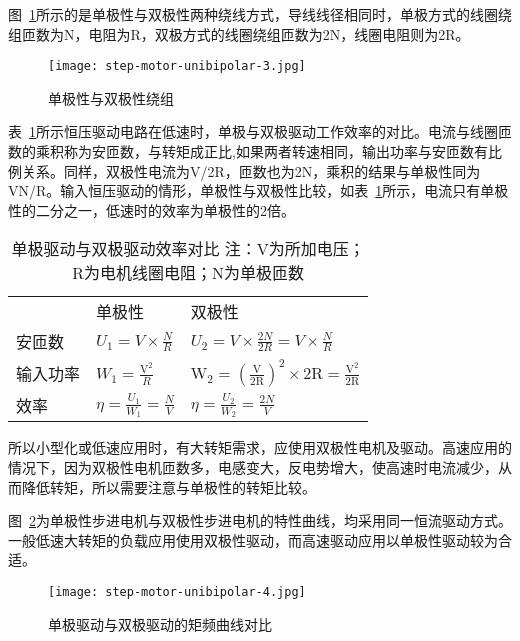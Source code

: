 图~\ref{fig:step-motor-unibipolar-3}所示的是单极性与双极性两种绕线方式，导线线径相同时，单极方式的线圈绕组匝数为N，电阻为R，双极方式的线圈绕组匝数为2N，线圈电阻则为2R。

\begin{figure}[htbp]
    \centering
    \texttt{[image: step-motor-unibipolar-3.jpg]}
    \caption{单极性与双极性绕组}
    \label{fig:step-motor-unibipolar-3}
\end{figure}

表~\ref{tab:step-motor-unibipolar}所示恒压驱动电路在低速时，单极与双极驱动工作效率的对比。电流与线圈匝数的乘积称为安匝数，与转矩成正比,如果两者转速相同，输出功率与安匝数有比例关系。同样，双极性电流为V/2R，匝数也为2N，乘积的结果与单极性同为VN/R。输入恒压驱动的情形，单极性与双极性比较，如表~\ref{tab:step-motor-unibipolar}所示，电流只有单极性的二分之一，低速时的效率为单极性的2倍。

\begin{table}[htbp]
    \centering
    \begin{tabular}{lll}
     & 单极性 & 双极性 \\
    安匝数 & $U_{1}=V \times \frac{N}{R}$ & $U_{2}=V \times \frac{2N}{2R}=V \times \frac{N}{R}$\\
    输入功率 & $W_{1}=\frac{\mathrm{V}^{2}}{R}$ & $\mathrm{W}_{2}=(\frac{\mathrm{V}}{2 \mathrm{R}} )^{2} \times  2 \mathrm{R}=\frac{\mathrm{V}^{2}}{2 \mathrm{R}} $ \\
    效率 & $\eta = \frac{U_{1}}{W_{1}} = \frac{N}{V}$ & $\eta = \frac{U_{2}}{W_{2}} = \frac{2N}{V}$
    \end{tabular}
    \caption{单极驱动与双极驱动效率对比 注：V为所加电压；R为电机线圈电阻；N为单极匝数}
    \label{tab:step-motor-unibipolar}
\end{table}

所以小型化或低速应用时，有大转矩需求，应使用双极性电机及驱动。高速应用的情况下，因为双极性电机匝数多，电感变大，反电势增大，使高速时电流减少，从而降低转矩，所以需要注意与单极性的转矩比较。

图~\ref{fig:step-motor-unibipolar-4}为单极性步进电机与双极性步进电机的特性曲线，均采用同一恒流驱动方式。一般低速大转矩的负载应用使用双极性驱动，而高速驱动应用以单极性驱动较为合适。

\begin{figure}[htbp]
    \centering
    \texttt{[image: step-motor-unibipolar-4.jpg]}
    \caption{单极驱动与双极驱动的矩频曲线对比}
    \label{fig:step-motor-unibipolar-4}
\end{figure}


